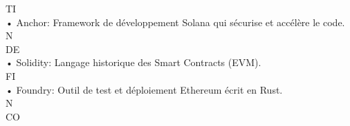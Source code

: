 \documentclass[12pt,landscape,a4paper]{article}
\begin{document}
TI\\
• Anchor: Framework de développement Solana qui sécurise et accélère le code.\\
\vspace{0.5em}
\vspace{0.5em}
\vspace{0.5em}
\vspace{0.5em}
N\\
DE\\
• Solidity: Langage historique des Smart Contracts (EVM).\\
\vspace{0.5em}
\vspace{0.5em}
\vspace{0.5em}
\vspace{0.5em}
FI\\
• Foundry: Outil de test et déploiement Ethereum écrit en Rust.\\
\vspace{0.5em}
\vspace{0.5em}
\vspace{0.5em}
\vspace{0.5em}
N\\
CO\\
\end{document}
